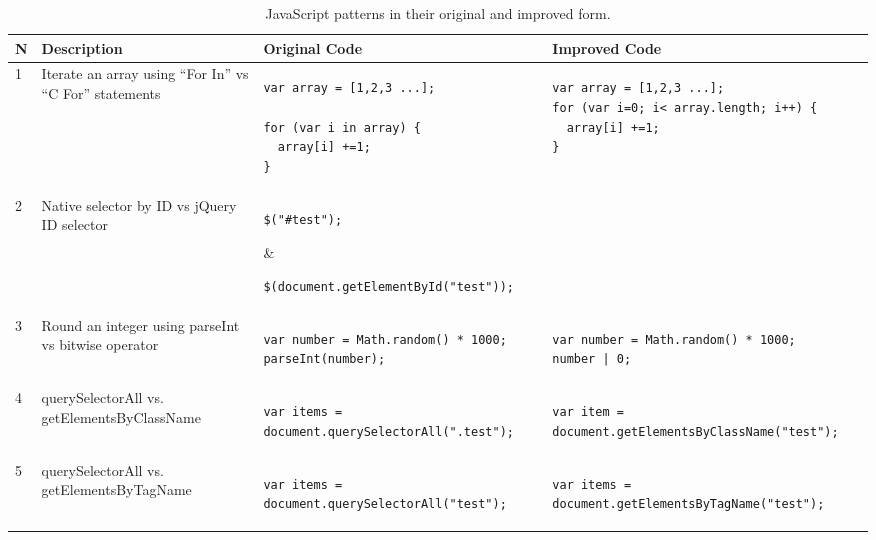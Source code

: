 \documentclass[preprint,10pt]{sigplanconf}
\begin{document}
\begin{table}
\begin{tabular}{ |  l  |  p{3.2cm} | p{6.1cm} | p{6.5cm} | }
\hline
N & 
Description & 
Original Code & 
Improved Code \\
\hline
1 &
Iterate an array using “For In” vs “C For” statements &
\begin{lstlisting}
var array = [1,2,3 ...];

for (var i in array) {
  array[i] +=1;
} 
\end{lstlisting} 
&
\begin{lstlisting}
var array = [1,2,3 ...];
for (var i=0; i< array.length; i++) {
  array[i] +=1;
}
\end{lstlisting}
\\
\hline
2 &
Native selector by ID vs jQuery ID selector &
\begin{lstlisting}
$("#test");
\end{lstlisting}
&
\begin{lstlisting}
$(document.getElementById("test"));
\end{lstlisting}
\\
\hline
3 &
Round an integer using parseInt vs bitwise operator &
\begin{lstlisting}
var number = Math.random() * 1000;
parseInt(number);
\end{lstlisting}
&
\begin{lstlisting}
var number = Math.random() * 1000;
number | 0;
\end{lstlisting}
\\
\hline
4 &
querySelectorAll vs. getElementsByClassName &
\begin{lstlisting}
var items = document.querySelectorAll(".test");
\end{lstlisting}
&
\begin{lstlisting}
var item = document.getElementsByClassName("test");
\end{lstlisting}
\\
\hline
5 &
querySelectorAll vs. getElementsByTagName &
\begin{lstlisting}
var items = document.querySelectorAll("test");
\end{lstlisting}
&
\begin{lstlisting}
var items = document.getElementsByTagName("test");
\end{lstlisting}
\\
\hline
\end{tabular}
\caption{JavaScript patterns in their original and improved form.}
\label{tab:1}
\end{table}
\end{document}
